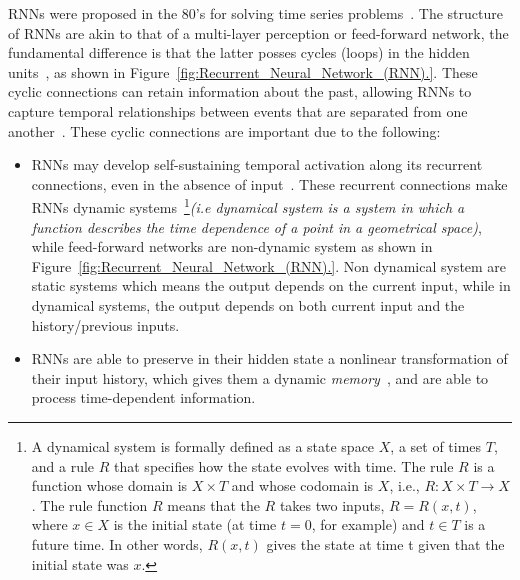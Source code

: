 \documentclass{WitsPhysicsReport}
\begin{document}
RNNs were proposed in the  80's for solving time series problems~\cite{elman1990finding,rumelhart1986learning, werbos1988generalization}. The structure of RNNs are akin to that of a multi-layer perception or feed-forward network, the fundamental difference is that the latter posses cycles (loops) in the hidden  units~\cite{lukovsevivcius2009reservoir}, as shown in Figure~\ref{fig:Recurrent_Neural_Network_(RNN).}. These cyclic connections can retain information about the past, allowing RNNs to capture temporal relationships between events that are separated from one another~\cite{DBLP:journals/corr/abs-1211-5063}. These cyclic connections are important due to the following:


\begin{itemize}
\item RNNs may develop self-sustaining temporal activation along its recurrent connections, even in the absence of input~\cite{lukovsevivcius2009reservoir}. These recurrent connections make RNNs dynamic systems~\footnote{A dynamical system is formally defined as a state space $X$, a set of times $T$, and a rule $R$ that specifies how the state evolves with time. The rule $R$ is a function whose domain is $X \times T$ and whose codomain is $X$, i.e., $R:X \times T \rightarrow X$. The rule function $R$ means that the $R$ takes two inputs, $R=R(x,t)$, where $x \in X$ is the initial state (at time $t=0$, for example) and $t \in T$ is a future time. In other words, $R(x,t)$ gives the state at time t given that the initial state was $x.$}\textit{(i.e dynamical system is a system in which a function describes the time dependence of  a  point  in  a  geometrical  space)}, while feed-forward networks are non-dynamic system as shown in Figure~\ref{fig:Recurrent_Neural_Network_(RNN).}. Non dynamical system are static systems which means the output depends on the current input, while in dynamical systems, the output depends on both current input and the history/previous inputs.

\item RNNs are able to preserve in their hidden state a nonlinear transformation of their input history, which gives them a dynamic \textit{memory}~\cite{lukovsevivcius2009reservoir}, and are able to process time-dependent information.
\label{item:importance_of_loops}
\end{itemize}
\end{document}
